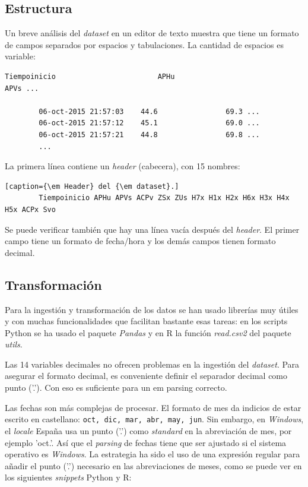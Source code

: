 \documentclass[11pt,spanish,listoffigures,listoftables]{tfgetsinf}
\begin{document}
        \subsection{Estructura}
        Un breve análisis del {\em dataset} en un editor de texto muestra que tiene un formato de campos separados por espacios y tabulaciones. La cantidad de espacios es variable:
    
        \lstset{style=default}
        \lstset{
          showspaces = true
        }
        \begin{lstlisting}[caption=Ejemplo del {\em dataset}.]
        Tiempoinicio                    	APHu                            	APVs ...
        
        06-oct-2015 21:57:03 	44.6             	69.3 ...
        06-oct-2015 21:57:12 	45.1             	69.0 ...
        06-oct-2015 21:57:21 	44.8             	69.8 ...
        ...
        \end{lstlisting}
        
        \lstset{
          showspaces = false
        }
        La primera línea contiene un {\em header} (cabecera), con 15 nombres: 
        \begin{lstlisting}[caption={\em Header} del {\em dataset}.]
        Tiempoinicio APHu APVs ACPv ZSx ZUs H7x H1x H2x H6x H3x H4x H5x ACPx Svo
        \end{lstlisting}
        
        Se puede verificar también que hay una línea vacía después del {\em header}. El primer campo tiene un formato de fecha/hora y los demás campos tienen formato decimal.
    
        \subsection{Transformación}
        Para la ingestión y transformación de los datos se han usado librerías muy útiles y con muchas funcionalidades que facilitan bastante esas tareas: en los scripts Python se ha usado el paquete {\em Pandas} y en R la función {\em read.csv2} del paquete {\em utils}.
        
        Las 14 variables decimales no ofrecen problemas en la ingestión del {\em dataset}. Para asegurar el formato decimal, es conveniente definir el separador decimal como punto ('.'). Con eso es suficiente para un {em parsing} correcto.
        
        Las fechas son más complejas de procesar. El formato de mes da indicios de estar escrito en castellano: {\tt oct, dic, mar, abr, may, jun}. Sin embargo, en {\em Windows}, el {\em locale} España usa un punto ('.') como {\em standard} en la abreviación de mes, por ejemplo 'oct.'. Así que el {\em parsing} de fechas tiene que ser ajustado si el sistema operativo es {\em Windows}. La estrategia ha sido el uso de una expresión regular para añadir el punto ('.') necesario en las abreviaciones de meses, como se puede ver en los siguientes {\em snippets} Python y R:
        
\end{document}

